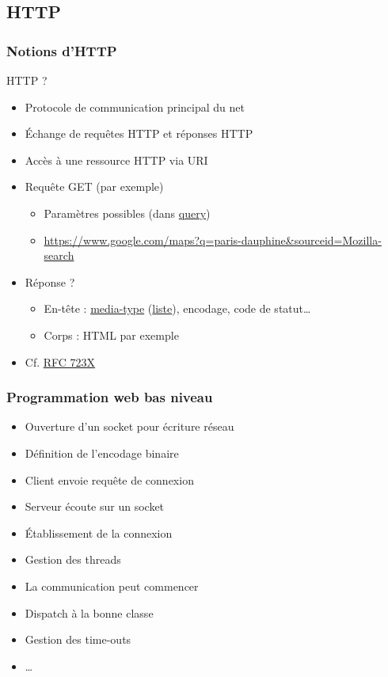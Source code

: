\documentclass[english, french]{beamer}
\begin{document}
\subsection{HTTP}
\begin{frame}
	\frametitle{Notions d’HTTP}
	HTTP ?\pause
	\begin{itemize}
		\item Protocole de communication principal du net
		\item Échange de requêtes HTTP et réponses HTTP
		\item Accès à une ressource HTTP via URI
		\item Requête GET (par exemple)
		\begin{itemize}
			\item Paramètres possibles (dans \og{}\href{http://tools.ietf.org/html/rfc3986\#section-3.4}{query}\fg{})
			\item \url{https://www.google.com/maps?q=paris-dauphine&sourceid=Mozilla-search}
		\end{itemize}
		\item Réponse ?\pause
		\begin{itemize}
			\item En-tête : \href{http://tools.ietf.org/html/rfc7231\#section-3.1.1.1}{media-type} (\href{http://www.iana.org/assignments/media-types/}{liste}), encodage, code de statut…
			\item Corps : HTML par exemple
		\end{itemize}
		\item Cf. \href{http://www.w3.org/Protocols/}{RFC 723X}
	\end{itemize}
\end{frame}

\begin{frame}
	\frametitle{Programmation web \og{}bas\fg{} niveau}
	\begin{itemize}
		\item Ouverture d’un socket pour écriture réseau
		\item Définition de l’encodage binaire
		\item Client envoie requête de connexion
		\item Serveur écoute sur un socket
		\item Établissement de la connexion
		\item Gestion des threads
		\item La communication peut commencer
		\item Dispatch à la bonne classe
		\item Gestion des time-outs
		\item …
	\end{itemize}
\end{frame}
\end{document}
